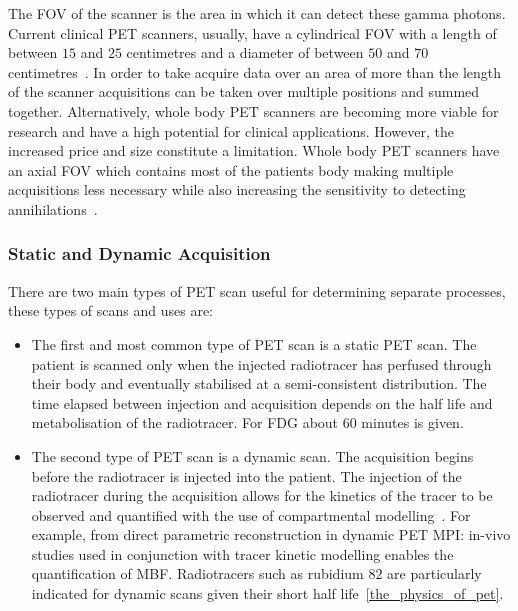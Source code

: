             The \gls{FOV} of the scanner is the area in which it can detect these gamma photons. Current clinical \gls{PET} scanners, usually, have a cylindrical \gls{FOV} with a length of between $15$ and $25$ centimetres and a diameter of between $50$ and $70$ centimetres~. In order to take acquire data over an area of more than the length of the scanner acquisitions can be taken over multiple positions and summed together. Alternatively, whole body \gls{PET} scanners are becoming more viable for research and have a high potential for clinical applications. However, the increased price and size constitute a limitation. Whole body \gls{PET} scanners have an axial \gls{FOV} which contains most of the patients body making multiple acquisitions less necessary while also increasing the sensitivity to detecting annihilations~.
            
            \subsubsection{Static and Dynamic Acquisition} \label{static_and_dynamic_acquisition}
                There are two main types of \gls{PET} scan useful for determining separate processes, these types of scans and uses are:
                
                \begin{itemize}
                    \item The first and most common type of \gls{PET} scan is a static \gls{PET} scan. The patient is scanned only when the injected radiotracer has perfused through their body and eventually stabilised at a semi-consistent distribution. The time elapsed between injection and acquisition depends on the half life and metabolisation of the radiotracer. For \gls{FDG} about $60$ minutes is given.
                    
                    \item The second type of \gls{PET} scan is a dynamic scan. The acquisition begins before the radiotracer is injected into the patient. The injection of the radiotracer during the acquisition allows for the kinetics of the tracer to be observed and quantified with the use of compartmental modelling~. For example, from direct parametric reconstruction in dynamic \gls{PET} \gls{MPI}: in-vivo studies used in conjunction with tracer kinetic modelling enables the quantification of \gls{MBF}. Radiotracers such as rubidium $82$ are particularly indicated for dynamic scans given their short half life~\ref{the_physics_of_pet}.
                \end{itemize}
            
